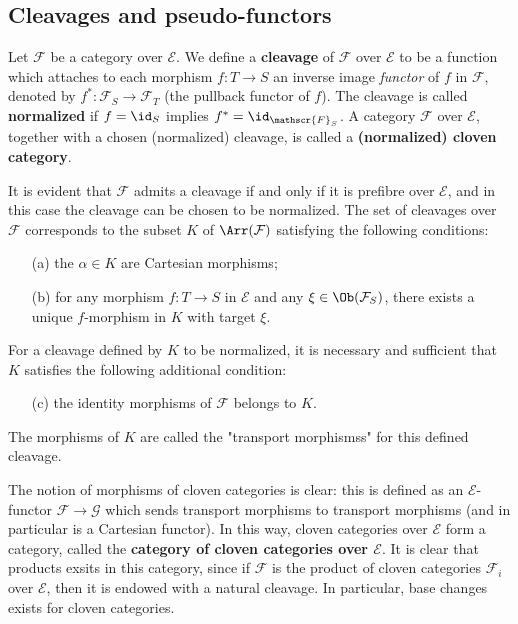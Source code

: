 \subsection{Cleavages and pseudo-functors}
Let $\mathcal{F}$ be a category over $\mathcal{E}$. We define a \textbf{cleavage} of $\mathcal{F}$ over $\mathcal{E}$ to be a function which attaches to each morphism $f:T\to S$ an inverse image \textit{functor} of $f$ in $\mathscr{F}$, denoted by $f^*:\mathscr{F}_S\to \mathscr{F}_T$ (the pullback functor of $f$). The cleavage is called \textbf{normalized} if $f=\id_S$ implies $f^*=\id_{\mathscr{F}_S}$. A category $\mathcal{F}$ over $\mathcal{E}$, together with a chosen (normalized) cleavage, is called a \textbf{(normalized) cloven category}.\par
It is evident that $\mathcal{F}$ admits a cleavage if and only if it is prefibre over $\mathcal{E}$, and in this case the cleavage can be chosen to be normalized. The set of cleavages over $\mathcal{F}$ corresponds to the subset $K$ of $\Arr(\mathcal{F})$ satisfying the following conditions:
\begin{enumerate}
\item[(a)] the $\alpha\in K$ are Cartesian morphisms;
\item[(b)] for any morphism $f:T\to S$ in $\mathcal{E}$ and any $\xi\in\Ob(\mathcal{F}_S)$, there exists a unique $f$-morphism in $K$ with target $\xi$.
\end{enumerate}
For a cleavage defined by $K$ to be normalized, it is necessary and sufficient that $K$ satisfies the following additional condition:
\begin{enumerate}
\item[(c)] the identity morphisms of $\mathscr{F}$ belongs to $K$.
\end{enumerate}
The morphisms of $K$ are called the "transport morphismss" for this defined cleavage.\par
The notion of morphisms of cloven categories is clear: this is defined as an $\mathcal{E}$-functor $\mathcal{F}\to \mathcal{G}$ which sends transport morphisms to transport morphisms (and in particular is a Cartesian functor). In this way, cloven categories over $\mathcal{E}$ form a category, called the \textbf{category of cloven categories over $\mathcal{E}$}. It is clear that products exsits in this category, since if $\mathcal{F}$ is the product of cloven categories $\mathcal{F}_i$ over $\mathcal{E}$, then it is endowed with a natural cleavage. In particular, base changes exists for cloven categories.\par
